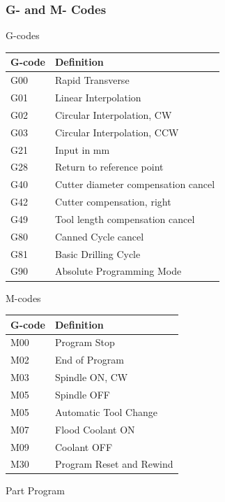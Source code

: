 \subsubsection{G- and M- Codes}
\begin{table}[!h]
	\caption[G-Codes]{G-codes}
\end{table}
\begin{center}
\centering
\begin{tabular}{|l|l|}
\hline
G-code & Definition\\
\hline

G00 & Rapid Transverse\\
G01 & Linear Interpolation\\
G02 & Circular Interpolation, CW\\
G03 & Circular Interpolation, CCW\\
G21 & Input in mm\\
G28 & Return to reference point\\
G40 & Cutter diameter compensation cancel\\
G42 & Cutter compensation, right\\
G49 & Tool length compensation cancel\\
G80 & Canned Cycle cancel\\
G81 & Basic Drilling Cycle\\
G90 & Absolute Programming Mode\\
\hline
\end{tabular}
\end{center}
\begin{table}[!h]
	\caption[M-Codes]{M-codes}
\end{table}
\begin{center}
\centering
\begin{tabular}{|l|l|}
\hline
G-code & Definition\\
\hline

M00 & Program Stop\\
M02 & End of Program\\
M03 & Spindle ON, CW\\
M05 & Spindle OFF\\
M05 & Automatic Tool Change\\
M07 & Flood Coolant ON\\
M09 & Coolant OFF\\
M30 & Program Reset and Rewind\\
\hline
\end{tabular}
\end{center}
\begin{table}[!h]
	\caption[Part Program]{Part Program}
\end{table}
